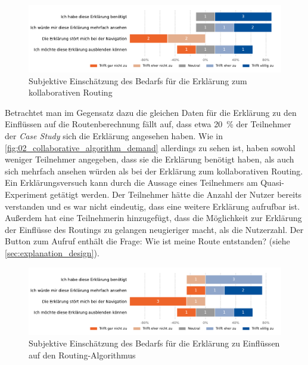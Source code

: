 \begin{figure}[b!]
    \centering
    \includegraphics[width=\textwidth]{contents/06_model_evaluation/02_evaluation/res/qualitativeFeedback-01_collaborative_routing_demand.pdf}
    \caption{Subjektive Einschätzung des Bedarfs für die Erklärung zum kollaborativen Routing}
    \label{fig:01_collaborative_routing_demand}
\end{figure}

Betrachtet man im Gegensatz dazu die gleichen Daten für die Erklärung zu den Einflüssen auf die Routenberechnung fällt auf, dass etwa 20~\% der Teilnehmer der \textit{Case Study} sich die Erklärung angesehen haben. Wie in \autoref{fig:02_collaborative_algorithm_demand} allerdings zu sehen ist, haben sowohl weniger Teilnehmer angegeben, dass sie die Erklärung benötigt haben, als auch sich mehrfach ansehen würden als bei der Erklärung zum kollaborativen Routing. Ein Erklärungsversuch kann durch die Aussage eines Teilnehmers am Quasi-Experiment getätigt werden. Der Teilnehmer hätte die Anzahl der Nutzer bereits verstanden und es war nicht eindeutig, dass eine weitere Erklärung aufrufbar ist. Außerdem hat eine Teilnehmerin hinzugefügt, dass die Möglichkeit zur Erklärung der Einflüsse des Routings zu gelangen neugieriger macht, als die Nutzerzahl. Der Button zum Aufruf enthält die Frage: \glqq Wie ist meine Route entstanden?\grqq{} (siehe \autoref{sec:explanation_design}).

\begin{figure}[htb!]
    \centering
    \includegraphics[width=\textwidth]{contents/06_model_evaluation/02_evaluation/res/qualitativeFeedback-02_collaborative_algorithm_demand.pdf}
    \caption{Subjektive Einschätzung des Bedarfs für die Erklärung zu Einflüssen auf den Routing-Algorithmus}
    \label{fig:02_collaborative_algorithm_demand}
\end{figure}

